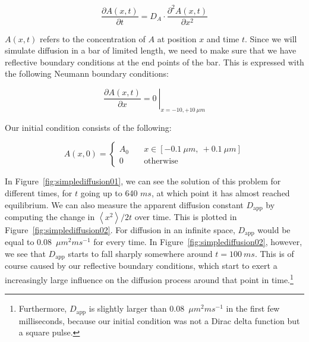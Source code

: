 \documentclass[a4paper,12pt]{book}
\begin{document}
\begin{equation}\label{eqn:simplediffusion01}
\frac{\partial A(x,t)}{\partial t} = D_A \cdot \frac{\partial^2 A(x,t)}{\partial x^2}
\end{equation}

$A(x,t)$ refers to the concentration of $A$ at position $x$ and time $t$. Since we will simulate diffusion in a bar of limited length, we need to make sure that we have reflective boundary conditions at the end points of the bar. This is expressed with the following Neumann boundary conditions:

\begin{equation}\label{eqn:simplediffusion02}
\left.\frac{\partial A(x,t)}{\partial x} = 0\ \right|_{x=-10,+10\ \mu m}
\end{equation}

Our initial condition consists of the following: 

\begin{equation}\label{eqn:simplediffusion03}
A(x,0) =
\left\{
\begin{aligned}
A_0 \quad & x \in [-0.1\ \mu m,\ +0.1\ \mu m]\\
0 \quad & \text{otherwise}
\end{aligned}
\right.
\end{equation}

In Figure~\ref{fig:simplediffusion01}, we can see the solution of this problem for different times, for $t$ going up to 640 $ms$, at which point it has almost reached equilibrium. We can also measure the apparent diffusion constant $D_\text{app}$ by computing the change in $\left< x^2 \right> / 2 t$ over time. This is plotted in Figure~\ref{fig:simplediffusion02}. For diffusion in an infinite space, $D_\text{app}$ would be equal to 0.08~$\mu m^{2}ms^{-1}$ for every time. In Figure~\ref{fig:simplediffusion02}, however, we see that $D_\text{app}$ starts to fall sharply somewhere around $t = 100\ ms$. This is of course caused by our reflective boundary conditions, which start to exert a increasingly large influence on the diffusion process around that point in time.\footnote{Furthermore, $D_\text{app}$ is slightly larger than 0.08~$\mu m^{2}ms^{-1}$ in the first few milliseconds, because our initial condition was not a Dirac delta function but a square pulse.}
\end{document}
